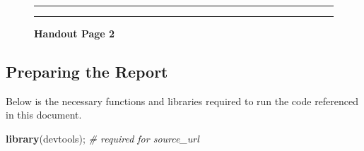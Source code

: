 \documentclass[]{article}
\newenvironment{Shaded}{\begin{snugshade}}{\end{snugshade}}
\newcommand{\CommentTok}[1]{\textcolor[rgb]{0.56,0.35,0.01}{\textit{#1}}}
\newcommand{\KeywordTok}[1]{\textcolor[rgb]{0.13,0.29,0.53}{\textbf{#1}}}
\newcommand{\NormalTok}[1]{#1}
\begin{document}
\begin{figure}[!ht]
    \hrule
    \caption{ \textbf{Handout Page 2} }
    \begin{center}
    \end{center}
    \label{fig:handout-2}
    \hrule
\end{figure}

\newpage

\subsection{Preparing the Report}
\label{sec:necessary-functions}

Below is the necessary functions and libraries required to run the code
referenced in this document.

\begin{Shaded}
\begin{Highlighting}[]
\KeywordTok{library}\NormalTok{(devtools);       }\CommentTok{\# required for source\_url}
\end{Highlighting}
\end{Shaded}
\end{document}
